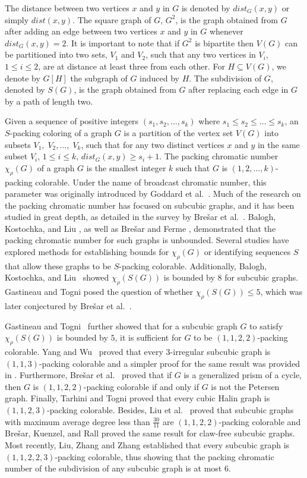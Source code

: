 \documentclass[12pt, oneside]{scrartcl}
\begin{document}
The distance between two vertices $x$ and $y$ in $G$ is denoted by $dist_G(x,y)$ or simply $dist(x,y)$. The square graph of $G$, $G^2$, is the graph obtained from $G$ after adding an edge between two vertices $x$ and $y$ in $G$ whenever  $dist_G(x,y)=2$. It is important to note that if $G^2$ is bipartite then $V(G)$ can be partitioned into two sets, $V_1$ and $V_2$, such that any two vertices in $V_i$, $1\leq i\leq 2$, are at distance at least three from each other.  
For $H \subseteq V (G)$, we denote by $G[H]$ the subgraph of $G$ induced by $H$. The subdivision of $G$, denoted by $S(G)$, is the graph obtained from $G$ after replacing each edge in $G$ by a path of length two. 

Given a sequence of positive integers $(s_1,s_2,\dots,s_k)$ where $s_1\leq s_2\leq \dots\leq s_k$, an $S$-packing coloring of a graph $G$ is a partition of the vertex set $V(G)$ into subsets $V_1,\; V_2,\dots, \; V_k$, such that for any two distinct vertices $x$ and $y$ in the same subset $V_i$, $1\leq i\leq k$, $dist_G(x,y)\geq s_i+1$. The packing chromatic number $\chi_{\rho}(G)$ of a graph $G$ is the smallest integer $k$ such that $G$ is $(1,2,\dots,k)$-packing colorable.  Under the name of broadcast chromatic number, this parameter was originally introduced by Goddard et al.~\cite{d}. Much of the research on the packing chromatic number has focused on subcubic graphs, and it has been studied in great depth, as detailed in the survey by Bre\v{s}ar et al.~\cite{bfk}.
Balogh, Kostochka, and Liu \cite{bkl}, as well as Bre\v{s}ar and Ferme \cite{bf}, demonstrated that the packing chromatic number for such graphs is unbounded. Several studies \cite{3,11,8,9,16,24,25} have explored methods for establishing bounds for $\chi_{\rho}(G)$ or identifying sequences $S$ that allow these graphs to be $S$-packing colorable. Additionally, Balogh, Kostochka, and Liu~\cite{3} showed $\chi_{\rho}(S(G))$ is bounded by 8 for subcubic graphs. Gastineau and Togni \cite{16} posed the question of whether $\chi_{\rho}(S(G))\leq 5$, which was later conjectured by Bre\v{s}ar et al.~\cite{9}.

Gastineau and Togni~\cite{16} further showed that for a subcubic graph $G$ to satisfy $\chi_{\rho}(S(G)) $ is bounded by $5$, it is sufficient for $G$ to be $(1, 1, 2, 2)$-packing colorable. Yang and Wu~\cite{a} proved that every 3-irregular subcubic graph is $(1,1,3)$-packing colorable and a simpler proof for the same result was provided in \cite{mai}. Furthermore, Bre\v{s}ar et al.~\cite{9} proved that if $G$ is a generalized prism of a cycle, then $G$ is $(1, 1, 2, 2)$-packing colorable if and only if $G$ is not the Petersen graph. Finally, Tarhini and Togni \cite{i} proved that every cubic Halin graph is $(1, 1, 2, 3)$-packing colorable. Besides, Liu et al.~\cite{m} proved that subcubic graphs with maximum average degree less than $\frac{30}{11}$ are $(1,1,2,2)$-packing colorable and Bre\v{s}ar, Kuenzel, and Rall \cite{BKR} proved the same result for claw-free subcubic graphs. Most recently, Liu, Zhang and Zhang \cite{LZZ24} established that every subcubic graph is $(1,1,2,2,3)$-packing colorable, thus showing that the packing chromatic number of the subdivision of any subcubic graph is at most $6$.
\end{document}
